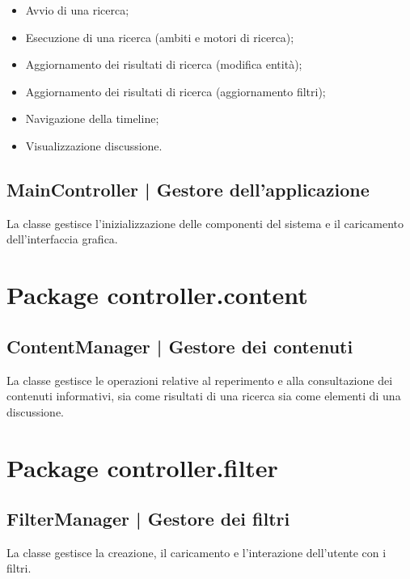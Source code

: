 \documentclass[10pt,a4paper,headinclude,footinclude,hidelinks]{scrreprt} %
\begin{document}
	\begin{itemize}
	\item Avvio di una ricerca;
	\item Esecuzione di una ricerca (ambiti e motori di ricerca);
	\item Aggiornamento dei risultati di ricerca (modifica entità);
	\item Aggiornamento dei risultati di ricerca (aggiornamento filtri);
	\item Navigazione della timeline;
	\item Visualizzazione discussione.
	\end{itemize}

	\subsection[MainController]{MainController | Gestore dell'applicazione}
	\label{sec:stage:design:controller:main-controller}
	La classe \textit{} gestisce l'inizializzazione delle componenti del sistema e il caricamento dell'interfaccia grafica.

	\section{Package controller.content}
	\label{sec:stage:design:controller.content}

	\subsection[ContentManager]{ContentManager | Gestore dei contenuti}
	\label{sec:stage:design:controller:content-manager}
	La classe \textit{} gestisce le operazioni relative al reperimento e alla consultazione dei contenuti informativi, sia come risultati di una ricerca sia come elementi di una discussione.

	\section{Package controller.filter}
	\label{sec:stage:design:controller.filter}

	\subsection[FilterManager]{FilterManager | Gestore dei filtri}
	\label{sec:stage:design:controller:filter-manager}
	La classe \textit{} gestisce la creazione, il caricamento e l'interazione dell'utente con i filtri.
\end{document}

